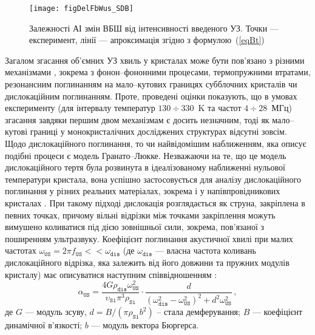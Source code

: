 \begin{figure}
\center
\texttt{[image: figDelFbWus\_SDB]}
\caption{\label{figDelFbWus_SDB}
Залежності АІ змін ВБШ від інтенсивності введеного УЗ.
Точки --- експеримент,
лінії --- апроксимація згідно з формулою~(\ref{eqBt})
}%
\end{figure}

Загалом згасання об'ємних УЗ хвиль у кристалах може бути пов'язано з різними механізмами \cite{True},
зокрема з фонон--фононними процесами,
термопружними втратами, резонансним поглинанням на мало--кутових границях субблочних кристалів чи дислокаційним поглинанням.
Проте, проведені оцінки показують, що в умовах експерименту (для інтервалу температур $130\div330$~K та частот $4\div28$~МГц) згасання завдяки першим двом механізмам
є досить незначним, тоді як мало--кутові границі у монокристалічних досліджених структурах відсутні зовсім.
Щодо дислокаційного поглинання, то чи найвідомішим наближенням, яка описує подібні процеси є модель Гранато--Люкке.
Незважаючи на те, що це модель дислокаційного тертя була розвинута в ідеалізованому наближенні нульової температури кристала, вона успішно застосовується для аналізу
дислокаційного поглинання у різних реальних матеріалах, зокрема і у напівпровідникових кристалах \cite{OstrKorBook,Nik}.
При такому підході дислокація розглядається як струна, закріплена в певних точках, причому вільні відрізки між точками закріплення можуть вимушено коливатися під дією зовнішньої сили, зокрема, пов'язаної з поширенням ультразвуку.
 Коефіцієнт поглинання акустичної хвилі при малих частотах $\omega_\mathtt{US}=2\pi f_\mathtt{US}<<\omega_\mathtt{dis}$
(де $\omega_\mathtt{dis}$ --- власна частота коливань дислокаційного відрізка, яка залежить від його довжини та пружних модулів кристалу)
 має описуватися наступним співвідношенням \cite{Granato,True}:
\begin{equation}
\label{eqAlphsGL}
\alpha_\mathtt{US}=\frac{4G\rho_\mathtt{dis}\omega_\mathtt{US}^2}{\upsilon_\mathtt{Si}\pi^3\rho_\mathtt{Si}}\cdot
    \frac{d}{(\omega_\mathtt{dis}^2-\omega_\mathtt{US}^2)^2+d^2\omega_\mathtt{US}^2}\,,
\end{equation}
де $G$ --- модуль зсуву,
$d = B/(\pi\rho_\mathtt{Si} b^2)$ -- стала демферування;
$B$ --- коефіцієнт динамічної в'язкості;
$b$ --- модуль вектора Бюргерса.

